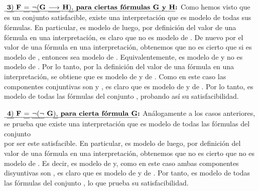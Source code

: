 \begin{isabellebody}
\begin{isamarkuptext}
\begin{demostracion}
      $\textbf{\isa{{\isasymthree}{\isacharparenright}\ F\ {\isacharequal}\ {\isasymnot}{\isacharparenleft}G\ {\isasymlongrightarrow}\ H{\isacharparenright}{\isacharcomma}\ para\ ciertas\ fórmulas\ G\ y\ H}:}$ Como hemos visto que  
      es un conjunto satisfacible, existe una interpretación \isa{{\isasymA}} que es modelo de todas sus 
      fórmulas. En particular, \isa{{\isasymA}} es modelo de  luego, por definición del valor de una fórmula 
      en una interpretación, es claro que \isa{{\isasymA}} no es modelo de . De nuevo por el valor de 
      una fórmula en una interpretación, obtenemos que no es cierto que si \isa{{\isasymA}} es modelo de , 
      entonces sea modelo de . Equivalentemente, \isa{{\isasymA}} es modelo de  y no es modelo de . Por 
      lo tanto, por la definición del valor de una fórmula en una interpretación, se obtiene que 
      \isa{{\isasymA}} es modelo de  y de . Como en este caso las componentes conjuntivas son  y
      , es claro que \isa{{\isasymA}} es modelo de  y de . Por lo tanto, \isa{{\isasymA}} es modelo de 
      todas las fórmulas del conjunto  , probando así su satisfacibilidad.

      $\textbf{\isa{{\isasymfour}{\isacharparenright}\ F\ {\isacharequal}\ {\isasymnot}{\isacharparenleft}{\isasymnot}\ G{\isacharparenright}{\isacharcomma}\ para\ cierta\ fórmula\ G}:}$ Análogamente a los casos anteriores, se 
      prueba que existe una interpretación \isa{{\isasymA}} que es modelo de todas las fórmulas del conjunto\\ 
       por ser este satisfacible. En particular, \isa{{\isasymA}} es modelo de  luego, por 
      definición del valor de una fórmula en una interpretación, obtenemos que no es cierto que \isa{{\isasymA}} 
      no es modelo de . Es decir, \isa{{\isasymA}} es modelo de  y, como en este caso ambas componentes 
      disyuntivas son , es claro que \isa{{\isasymA}} es modelo de  y de . Por tanto, \isa{{\isasymA}} es modelo 
      de todas las fórmulas del conjunto , lo que prueba su satisfacibilidad.


\end{demostracion}
\end{isamarkuptext}
\end{isabellebody}
